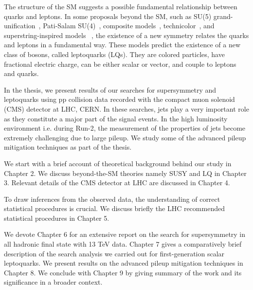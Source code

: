 The structure of the SM  suggests a possible fundamental relationship between quarks and leptons. In some proposals beyond the SM, such as SU(5) grand-unification~\cite{guts}, Pati-Salam SU(4)~\cite{LQ3}, composite models~\cite{composite}, technicolor~\cite{ LQ2, technicolor2, technicolor3}, and superstring-inspired models ~\cite{superstring_e6}, the existence of a new symmetry relates the quarks and leptons in a
fundamental way. These models predict the existence of a new class of bosons, called leptoquarks (LQs). They are 
colored particles, have fractional electric charge, can be either scalar or vector, and couple to leptons and quarks. 

In the thesis, we present results of our searches for supersymmetry and leptoquarks using pp collision data recorded  with the compact muon solenoid (CMS) detector at LHC, CERN. In these searches, jets play a very important role as they constitute a major part of the signal events. In the high luminosity environment i.e. during Run-2, the measurement of the properties of jets become extremely challenging due to large pileup. We  study some of the advanced pileup mitigation techniques as part of the thesis. 

  

We start with a brief account of  theoretical background behind our study in Chapter 2. We discuss beyond-the-SM  theories namely SUSY and LQ  in Chapter 3. Relevant details of the CMS detector at LHC are discussed in Chapter 4. 

To draw inferences from the observed data, the understanding of correct statistical procedures is crucial. We discuss briefly the LHC recommended statistical procedures in Chapter 5.

We devote Chapter 6 for an extensive report on the search for supersymmetry in all hadronic final state with 13 TeV data. Chapter 7 gives a comparatively brief description of the search analysis we carried out for first-generation scalar leptoquarks. We present results on the advanced pileup mitigation techniques in Chapter 8. We conclude with Chapter 9 by giving summary of the work and its significance in a broader context.


